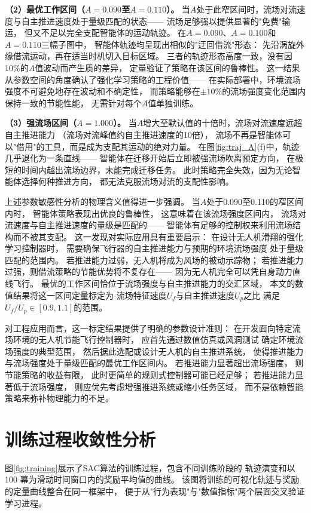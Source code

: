 \textbf{（2）最优工作区间（$A = 0.090$至$A = 0.110$）。}
当$A$处于此窄区间时，流场对流速度与自主推进速度处于量级匹配的状态——
流场足够强以提供显著的"免费"输运，
但又不足以完全支配智能体的运动轨迹。
在$A = 0.090$、$A = 0.100$和$A = 0.110$三幅子图中，
智能体轨迹均呈现出相似的"迂回借流"形态：
先沿涡旋外缘借流运动，再在适当时机切入目标区域。
三者的轨迹形态高度一致，没有因10\%的$A$值波动而产生质的差异，
定量验证了策略在该区间的鲁棒性。
这一结果从参数空间的角度确认了强化学习策略的工程价值——
在实际部署中，环境流场强度不可避免地存在波动和不确定性，
而策略能够在$\pm 10\%$的流场强度变化范围内保持一致的节能性能，
无需针对每个$A$值单独训练。

\textbf{（3）强流场区间（$A = 1.000$）。}
当$A$增大至默认值的十倍时，流场对流速度远超自主推进能力
（流场对流峰值约自主推进速度的10倍），
流场不再是智能体可以"借用"的工具，而是成为支配其运动的绝对力量。
在图\ref{fig:traj_A}(f)中，轨迹几乎退化为一条直线——
智能体在迁移开始后立即被强流场吹离预定方向，
在极短的时间内越出流场边界，未能完成迁移任务。
此时策略完全失效，因为无论智能体选择何种推进方向，
都无法克服流场对流的支配性影响。

上述参数敏感性分析的物理含义值得进一步强调。
当$A$处于0.090至0.110的窄区间内时，
智能体策略表现出优良的鲁棒性，
这意味着在该流场强度区间内，
流场对流速度与自主推进速度的量级是匹配的——
智能体有足够的控制权来利用流场结构而不被其支配。
这一发现对实际应用具有重要启示：
在设计无人机滑翔的强化学习控制器时，
需要确保飞行器的自主推进能力与预期的环境流场强度
处于量级匹配的范围内。
若推进能力过弱，无人机将成为风场的被动示踪物；
若推进能力过强，则借流策略的节能优势将不复存在——
因为无人机完全可以凭自身动力直线飞行。
最优的工作区间恰位于流场强度与自主推进能力的交汇区域，
本文的数值结果将这一区间定量标定为
流场特征速度$U_f$与自主推进速度$U_p$之比
满足$U_f/U_p \in [0.9, 1.1]$的范围。

对工程应用而言，这一标定结果提供了明确的参数设计准则：
在开发面向特定流场环境的无人机节能飞行控制器时，
应首先通过数值仿真或风洞测试
确定环境流场强度的典型范围，
然后据此选配或设计无人机的自主推进系统，
使得推进能力与流场强度处于量级匹配的最优工作区间内。
若推进能力显著超出流场强度，
则节能策略的收益有限，
此时更简单的规则式控制器可能已经足够；
若推进能力显著低于流场强度，
则应优先考虑增强推进系统或缩小任务区域，
而不是依赖智能策略来弥补物理能力的不足。

\section{训练过程收敛性分析}

图\ref{fig:training}展示了SAC算法的训练过程，包含不同训练阶段的
轨迹演变和以 100 幕为滑动时间窗口内的奖励平均值的曲线。
该图将训练的可视化轨迹与奖励的定量曲线整合在同一框架中，
便于从"行为表现"与"数值指标"两个层面交叉验证学习进程。

